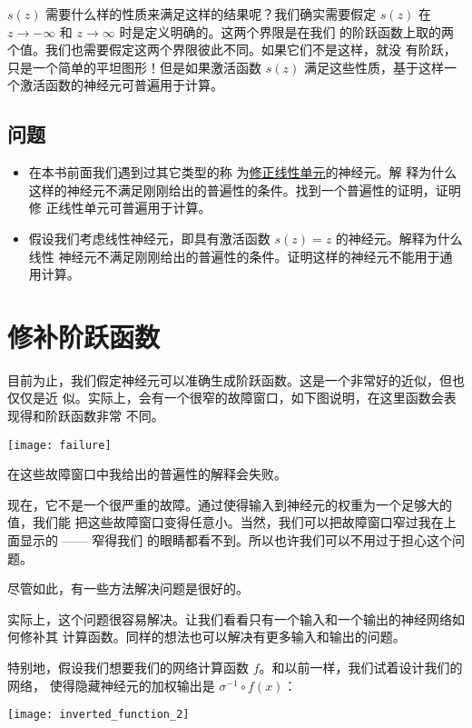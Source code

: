 $s(z)$ 需要什么样的性质来满足这样的结果呢？我们确实需要假定 $s(z)$ 在 $z
\rightarrow -\infty$ 和 $z \rightarrow \infty$ 时是定义明确的。这两个界限是在我们
的阶跃函数上取的两个值。我们也需要假定这两个界限彼此不同。如果它们不是这样，就没
有阶跃，只是一个简单的平坦图形！但是如果激活函数 $s(z)$ 满足这些性质，基于这样一
个激活函数的神经元可普遍用于计算。

\subsection*{问题}

\begin{itemize}
\item 在本书前面我们遇到过其它类型的称
  为\hyperref[subsec:other_models_of_artificial_neuron]{修正线性单元}的神经元。解
  释为什么这样的神经元不满足刚刚给出的普遍性的条件。找到一个普遍性的证明，证明修
  正线性单元可普遍用于计算。
\item 假设我们考虑线性神经元，即具有激活函数 $s(z) = z$ 的神经元。解释为什么线性
  神经元不满足刚刚给出的普遍性的条件。证明这样的神经元不能用于通用计算。
\end{itemize}

\section{修补阶跃函数}
\label{sec:fixing_up_the_step_functions}

目前为止，我们假定神经元可以准确生成阶跃函数。这是一个非常好的近似，但也仅仅是近
似。实际上，会有一个很窄的故障窗口，如下图说明，在这里函数会表现得和阶跃函数非常
不同。
\begin{center}
  \texttt{[image: failure]}
\end{center}

在这些故障窗口中我给出的普遍性的解释会失败。

现在，它不是一个很严重的故障。通过使得输入到神经元的权重为一个足够大的值，我们能
把这些故障窗口变得任意小。当然，我们可以把故障窗口窄过我在上面显示的 —— 窄得我们
的眼睛都看不到。所以也许我们可以不用过于担心这个问题。

尽管如此，有一些方法解决问题是很好的。

实际上，这个问题很容易解决。让我们看看只有一个输入和一个输出的神经网络如何修补其
计算函数。同样的想法也可以解决有更多输入和输出的问题。

特别地，假设我们想要我们的网络计算函数 $f$。和以前一样，我们试着设计我们的网络，
使得隐藏神经元的加权输出是 $\sigma^{-1} \circ f(x)$：
\begin{center}
  \texttt{[image: inverted\_function\_2]}
\end{center}


